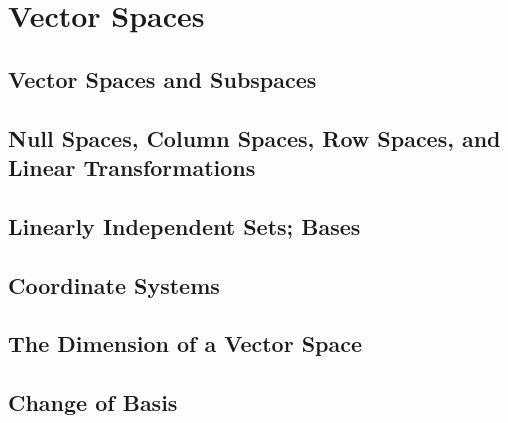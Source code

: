 \documentclass[../linalg.tex]{subfiles}
\begin{document}
\chapter{Vector Spaces}
\section{Vector Spaces and Subspaces}
\section{Null Spaces, Column Spaces, Row Spaces, and Linear Transformations}
\section{Linearly Independent Sets; Bases}
\section{Coordinate Systems}
\section{The Dimension of a Vector Space}
\section{Change of Basis}
\end{document}
